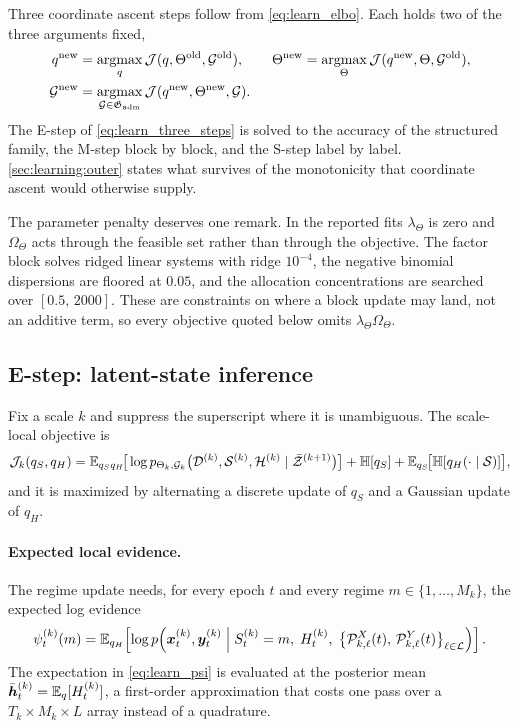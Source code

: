 Three coordinate ascent steps follow from \cref{eq:learn_elbo}. Each holds two of the three
arguments fixed,
\begin{align}
q^{\mathrm{new}} &= \operatorname*{argmax}_q {\mathcal{J}}(q,\Theta^{\mathrm{old}},{\mathcal{G}}^{\mathrm{old}}),
\qquad
\Theta^{\mathrm{new}} = \operatorname*{argmax}_\Theta {\mathcal{J}}(q^{\mathrm{new}},\Theta,{\mathcal{G}}^{\mathrm{old}}),
\nonumber\\
{\mathcal{G}}^{\mathrm{new}} &= \operatorname*{argmax}_{{\mathcal{G}} \in \mathfrak{G}_{\mathrm{adm}}} {\mathcal{J}}(q^{\mathrm{new}},\Theta^{\mathrm{new}},{\mathcal{G}}).
\label{eq:learn_three_steps}
\end{align}
The E-step of \cref{eq:learn_three_steps} is solved to the accuracy of the structured family, the
M-step block by block, and the S-step label by label. \cref{sec:learning:outer} states what
survives of the monotonicity that coordinate ascent would otherwise supply.

The parameter penalty deserves one remark. In the reported fits $\lambda_\Theta$ is zero and
$\Omega_\Theta$ acts through the feasible set rather than through the objective. The factor block
solves ridged linear systems with ridge $10^{-4}$, the negative binomial dispersions are floored
at $0.05$, and the allocation concentrations are searched over $[0.5,\,2000]$. These are
constraints on where a block update may land, not an additive term, so every objective quoted
below omits $\lambda_\Theta \Omega_\Theta$.

\subsection{E-step: latent-state inference}
\label{sec:learning:estep}

Fix a scale $k$ and suppress the superscript where it is unambiguous. The scale-local objective
is
\begin{align}
{\mathcal{J}}_k(q_S,q_H)
=
\mathbb{E}_{q_S q_H}\!\big[\log p_{\Theta_k,{\mathcal{G}}_k}\big({\mathcal{D}}^{(k)},{\mathcal{S}}^{(k)},{\mathcal{H}}^{(k)} \mid \bar{{\mathcal{Z}}}^{(k+1)}\big)\big]
+
\mathbb{H}[q_S]
+
\mathbb{E}_{q_S}\!\big[\mathbb{H}[q_H(\cdot \mid {\mathcal{S}})]\big],
\label{eq:learn_scale_objective}
\end{align}
and it is maximized by alternating a discrete update of $q_S$ and a Gaussian update of $q_H$.

\paragraph{Expected local evidence.}
The regime update needs, for every epoch $t$ and every regime $m \in \{1,\dots,M_k\}$, the
expected log evidence
\begin{align}
\psi_t^{(k)}(m)
=
\mathbb{E}_{q_H}\!\left[
\log p\!\left(
{\bm{x}}_t^{(k)}, {\bm{y}}_t^{(k)}
\;\middle|\;
S_t^{(k)}=m,\; H_t^{(k)},\;
\big\{{\mathcal{P}}_{k,\ell}^{X}(t),\, {\mathcal{P}}_{k,\ell}^{Y}(t)\big\}_{\ell \in {\mathcal{L}}}
\right)
\right].
\label{eq:learn_psi}
\end{align}
The expectation in \cref{eq:learn_psi} is evaluated at the posterior mean
$\bar{{\bm{h}}}_t^{(k)} = \mathbb{E}_q[H_t^{(k)}]$, a first-order approximation that costs one pass over a
$T_k \times M_k \times L$ array instead of a quadrature.

